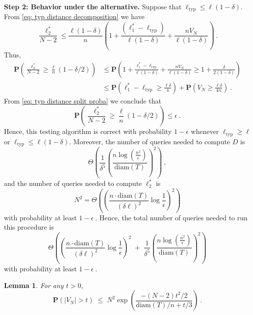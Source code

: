 \documentclass[12pt]{article}
\newtheorem{lemma}[theorem]{Lemma}
\newcommand{\prob}[1]{\mathbf{P}\left( #1 \right)}
\newcommand{\diam}[1]{\mathrm{diam}\!\left(#1\right)}
\begin{document}
\noindent
\textbf{Step 2: Behavior under the alternative.}  Suppose that $\ell_{\textrm{typ}}\le \ell(1-\delta)$. 
From \eqref{eq: typ distance decomposition} we have 
$$\frac{\ell_2^*}{N-2}\le \frac{\ell(1-\delta)}{n}\left( 1 + \frac{(\ell_1^*-\ell_{\textrm{typ}})}{\ell(1-\delta)} + \frac{nV_N}{\ell(1-\delta)}\right)~.$$ 
Thus, 
\begin{align}
    \prob{\frac{\ell_2^*}{N-2}\ge \frac{\ell}{n}(1-\delta/2)} &\le \prob{1+\frac{\ell_1^*-\ell_{\textrm{typ}}}{\ell(1-\delta)}+\frac{nV_N}{\ell(1-\delta)}\ge 1 + \frac{\delta}{2(1-\delta)}} \nonumber \\
    &\le \prob{\ell_1^*-\ell_{\textrm{typ}} \ge \frac{\ell\delta}{4}} + \prob{V_N\ge \frac{\ell\delta}{4n}}~.\nonumber
\end{align}
From \eqref{eq: typ distance split proba} we conclude that 
$$\prob{\frac{\ell_2^*}{N-2}\ge \frac{\ell}{n}(1-\delta/2)}\le \epsilon~.$$
Hence, this testing algorithm is correct with probability $1-\epsilon$ whenever $\ell_{\textrm{typ}}\ge \ell$ or $\ell_{\textrm{typ}}\le \ell(1-\delta).$ Moreover, the number of queries needed to compute $D$ is
$$\Theta\left(\frac{1}{\delta^5}\left(\frac{n\log(\frac{n^2}{\epsilon})}{\diam{T}}\right)^2\right)~,$$
and the number of queries needed to compute $\ell_2^*$ is 
\[ N^2= 
\Theta\!\left(
\left( \frac{n\cdot \diam{T}}{(\delta\ell)^2}\log\frac{1}{\epsilon} \right)^2
\right)
\]
with probability at least $1-\epsilon~.$ Hence, the total number of queries needed to run this procedure is 
\[
\Theta\!\left(
\left( \frac{n\cdot \diam{T}}{(\delta\ell)^2}\log\frac{1}{\epsilon} \right)^2
\;+\;
\frac{1}{\delta^5}\left(\frac{n\log(\frac{n^2}{\epsilon})}{\diam{T}}\right)^2
\right)
\]
with probability at least $1-\epsilon~.$
\begin{lemma}\label{lemma: typ dist bernoulli concentration}
For any $t>0$, $$\prob{|V_N|>t} \;\le\; N^2\exp \left(\frac{-(N-2)t^2/2}{\diam{T}/n + t/3} \right)~.$$
\end{lemma}
\end{document}
